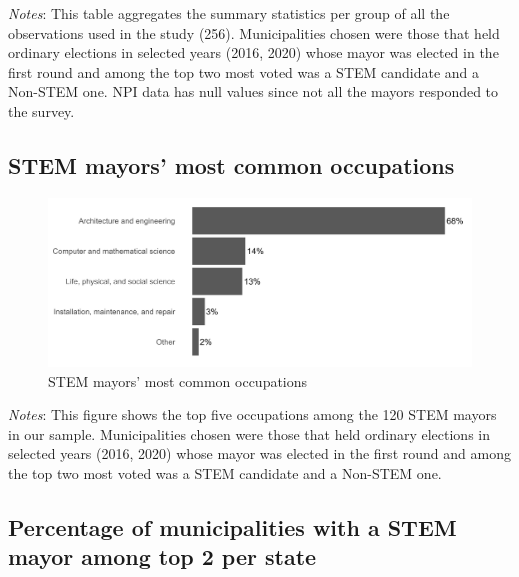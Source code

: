 \documentclass[
  letterpaper,
  DIV=11,
  numbers=noendperiod]{scrartcl}
\begin{document}
\emph{Notes}: This table aggregates the summary statistics per group of
all the observations used in the study (256). Municipalities chosen were
those that held ordinary elections in selected years (2016, 2020) whose
mayor was elected in the first round and among the top two most voted
was a STEM candidate and a Non-STEM one. NPI data has null values since
not all the mayors responded to the survey.

\subsection{STEM mayors' most common
occupations}\label{stem-mayors-most-common-occupations}

\begin{figure}[H]

\caption{STEM mayors' most common occupations}

{\centering \includegraphics{outputs/figures/barplot_stem_cbos_stem_ocupacao.png}

}

\end{figure}%

\emph{Notes}: This figure shows the top five occupations among the 120
STEM mayors in our sample. Municipalities chosen were those that held
ordinary elections in selected years (2016, 2020) whose mayor was
elected in the first round and among the top two most voted was a STEM
candidate and a Non-STEM one.

\subsection{Percentage of municipalities with a STEM mayor among top 2
per
state}\label{percentage-of-municipalities-with-a-stem-mayor-among-top-2-per-state}
\end{document}

